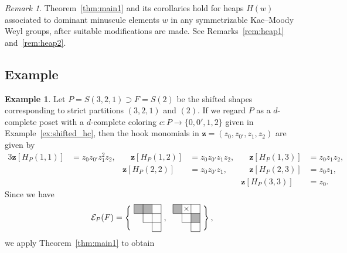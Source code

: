 \documentclass[10pt]{amsart}
\theoremstyle{definition}
\newtheorem{exam}[theo]{Example}
\theoremstyle{remark}
\newtheorem{rema}[theo]{Remark}
\newcommand\vectz{\boldsymbol{z}}
\begin{document}
\begin{rema}
\label{rem:heap3}
Theorem~\ref{thm:main1} and its corollaries hold for heaps $H(w)$ associated 
to dominant minuscule elements $w$ in any symmetrizable Kac--Moody Weyl groups, 
after suitable modifications are made.
See Remarks~\ref{rem:heap1} and~\ref{rem:heap2}.
\end{rema}

\subsection{%
Example
}

\begin{exam}
\label{ex:dc}
Let $P = S(3,2,1) \supset F = S(2)$ be the shifted shapes corresponding 
to strict partitions $(3,2,1)$ and $(2)$.
If we regard $P$ as a $d$-complete poset with a $d$-complete coloring $c : P \to \{ 0, 0', 1, 2 \}$ 
given in Example~\ref{ex:shifted_hc}, 
then the hook monomials in 
${{\vectz}} = (z_0, z_{0'}, z_1, z_2)$ are given by
\begin{alignat*}{3}
{{\vectz}}[ H_P(1,1) ] &= z_0 z_{0'} z_1^2 z_2,
&\quad
{{\vectz}}[ H_P(1,2) ] &= z_0 z_{0'} z_1 z_2,
&\quad
{{\vectz}}[ H_P(1,3) ] &= z_0 z_1 z_2,
\\
&
&
{{\vectz}}[ H_P(2,2) ] &= z_0 z_{0'} z_1,
&\quad
{{\vectz}}[ H_P(2,3) ] &= z_0 z_1,
\\
&
&
&
&{{\vectz}}[ H_P(3,3) ] &= z_0.
\end{alignat*}
Since we have
$$
\setlength{\unitlength}{1.1pt}
\mathcal{E}_P(F)
 =
\left\{
\raisebox{-14pt}{
\begin{picture}(30,30)
\fboxsep=0mm
\put(0,20){\colorbox[gray]{0.7}{\makebox(10,10){}}}
\put(10,20){\colorbox[gray]{0.7}{\makebox(10,10){}}}
\put(0,30){\line(1,0){30}}
\put(0,20){\line(1,0){30}}
\put(10,10){\line(1,0){20}}
\put(20,0){\line(1,0){10}}
\put(0,20){\line(0,1){10}}
\put(10,10){\line(0,1){20}}
\put(20,0){\line(0,1){30}}
\put(30,0){\line(0,1){30}}
\end{picture}
},
\ 
\raisebox{-14pt}{
\begin{picture}(30,30)
\fboxsep=0mm
\put(0,20){\colorbox[gray]{0.7}{\makebox(10,10){}}}
\put(20,10){\colorbox[gray]{0.7}{\makebox(10,10){}}}
\put(0,30){\line(1,0){30}}
\put(0,20){\line(1,0){30}}
\put(10,10){\line(1,0){20}}
\put(20,0){\line(1,0){10}}
\put(0,20){\line(0,1){10}}
\put(10,10){\line(0,1){20}}
\put(20,0){\line(0,1){30}}
\put(30,0){\line(0,1){30}}
\put(10,20){\makebox(10,10){$\times$}}
\end{picture}
}
\right\},
$$
we apply Theorem~\ref{thm:main1} to obtain

\end{exam}
\end{document}
